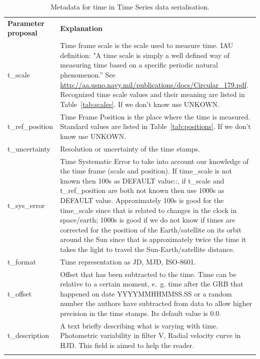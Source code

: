\documentclass[11pt,a4paper]{ivoa}
\begin{document}
\begin{table}[!htb]
  \begin{center}
    \caption{Metadata for time in Time Series data serialisation.}
    \label{tab:metadata}
      \begin{tabular}{p{}p{}}
      \sptablerule
      \textbf{Parameter proposal} & \textbf{Explanation} \\\sptablerule
      t\_scale & Time frame scale is the scale used to measure time. IAU definition: "A time scale is simply a well defined way of measuring time based on a specific periodic natural phenomenon.''  See \url{http://aa.usno.navy.mil/publications/docs/Circular_179.pdf}.
      Recognized time scale values and their meaning are listed in Table~\ref{tab:scales}. If we don't know use UNKOWN. \\
      t\_ref\_position &  Time Frame Position is the place where the time is measured. Standard values are listed in Table~\ref{tab:positions}. If we don't know use UNKOWN. \\
      t\_uncertainty & Resolution or uncertainty of the time stamps. \\
      t\_sys\_error  & Time Systematic Error to take into account our knowledge of the time frame (scale and position). If time\_scale is not known then 100s as DEFAULT value::, if t\_scale and t\_ref\_position are both not known then use  1000s as DEFAULT value. Approximately 100s is good for the time\_scale since that is related to changes in the clock in space/earth; 1000s is good if we do not know if times are corrected for the position of the Earth/satellite on its orbit around the Sun since that is approximately twice the time it takes the light to travel the Sun-Earth/satellite distance. \\
      t\_format  & Time representation as JD, MJD, ISO-8601. \\
      t\_offset &  Offset that has been subtracted to the time. Time can be relative to a certain moment, e.~g. time after the GRB that happened on date YYYYMMHHMMSS.SS or a random number the authors have subtracted from data to allow higher precision in the time stamps. Its default value is 0.0. \\
     t\_description & A text briefly describing what is varying with time. Photometric variability in filter V, Radial velocity curve in HJD. This field is aimed to help the reader. \\
    \sptablerule
    \end{tabular}
  \end{center}
\end{table}
\end{document}
